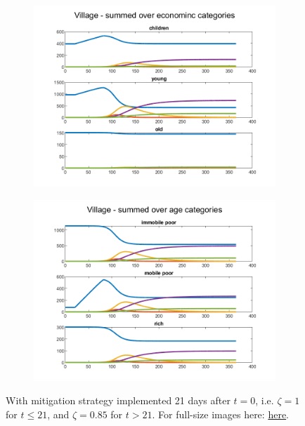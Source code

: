 \documentclass{article}
\begin{document}
\begin{figure}[H]
	\begin{subfigure}[b]{0.5\textwidth}
		\includegraphics[width=\textwidth]{no-economic-effect/weak-mitigation/Village-age-cat}
	\end{subfigure}%
	\begin{subfigure}[b]{0.5\textwidth}
		\includegraphics[width=\textwidth]{no-economic-effect/weak-mitigation/Village-eco-cat}
	\end{subfigure}
	
	\caption{With mitigation strategy implemented 21 days after $t = 0$, i.e. $\zeta = 1$ for $t \leq 21$, and $ \zeta = 0.85$ for $t > 21$. For full-size images here: \url{here}.}
\end{figure}
\end{document}
